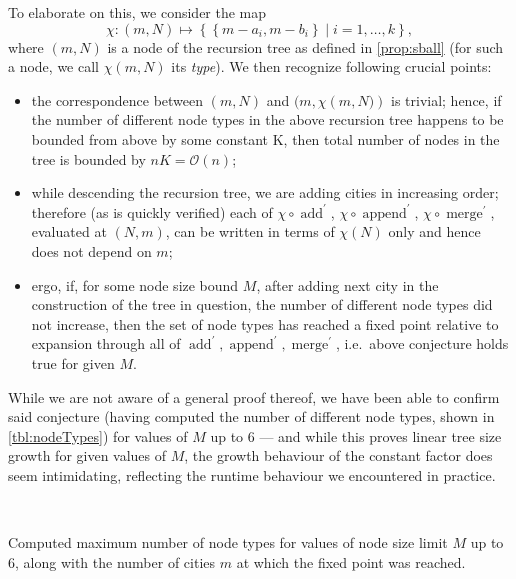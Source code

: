 \documentclass[index=totoc,bibliography=totoc]{scrartcl}
\numberwithin{equation}{section}
\numberwithin{figure}{section}
\numberwithin{table}{section}
\let\defstyle\itshape
\begin{document}
To elaborate on this, we consider the map
\[
  \chi : \left(m,N\right) \mapsto \left\{\left\{m-a_i,m-b_i\right\} \mid i = 1,\ldots,k \right\},
\]
where $\left(m,N\right)$ is a node of the recursion tree as defined in \cref{prop:sball}
(for such a node, we call $\chi\left(m,N\right)$ its {\defstyle type}).
We then recognize following crucial points:
\begin{itemize}
  \item
    the correspondence between $\left(m,N\right)$ and $(m,\chi\left(m,N)\right)$ is trivial;
    hence, if the number of different node types in the above recursion tree happens
    to be bounded from above by some constant K, then total number of nodes
    in the tree is bounded by $nK = \mathcal{O}\left(n\right)$;
  \item
    while descending the recursion tree, we are adding cities in increasing order;
    therefore (as is quickly verified) each of
    $\chi \circ \operatorname{add}^\prime$,
    $\chi \circ \operatorname{append}^\prime$,
    $\chi \circ \operatorname{merge}^\prime$,
    evaluated at $\left(N,m\right)$, can be written in terms of $\chi\left(N\right)$ only
    and hence does not depend on $m$;
  \item
    ergo, if, for some node size bound $M$, after adding next city in the
    construction of the tree in question, the number of different node
    types did not increase, then the set of node types has
    reached a fixed point relative to expansion through all of
    $\operatorname{add}^\prime, \operatorname{append}^\prime, \operatorname{merge}^\prime$,
    i.e.\ above conjecture holds true for given $M$.
\end{itemize}

While we are not aware of a general proof thereof, we have been able to confirm
said conjecture (having computed the number of different node types, shown
in \cref{tbl:nodeTypes}) for values of $M$ up to $6$ --- and while this
proves linear tree size growth for given values of $M$, the growth behaviour of
the constant factor does seem intimidating, reflecting the runtime
behaviour we encountered in practice.

\begin{table}[htb]
\centering
    \mbox{%
    }
\caption{Computed maximum number of node types for values of node size limit $M$ up to $6$,
  along with the number of cities $m$ at which the fixed point was reached.}%
\label{tbl:nodeTypes}%
\end{table}
\end{document}
